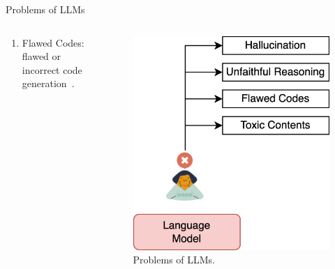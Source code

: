 \begin{frame}{Problems of LLMs}
\begin{columns}[T]
\begin{column}{0.70\textwidth}
\begin{enumerate}
                \item Flawed Codes: flawed or incorrect code generation~\cite{chen2023teaching, olausson2023selfrepair}.
            \end{enumerate}
        \end{column}
        \begin{column}{0.30\textwidth}
            \begin{figure}[!htb]
                \centering
                \includegraphics[width=1\textwidth]{img/language_model}
                \captionsetup{font=small,labelformat=empty}
                \caption{Problems of LLMs.}
            \end{figure}
        \end{column}
    \end{columns}
\end{frame}

